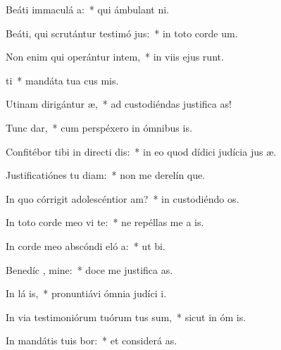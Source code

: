 \item Beáti immaculá  a:~* qui ámbulant   ni.
\item Beáti, qui scrutántur testimó jus:~* in toto corde  um.
\item Non enim qui operántur intem,~* in viis ejus runt.
\item {} ti~* mandáta tua cus mis.
\item Utinam dirigántur  æ,~* ad custodiéndas justifica as!
\item Tunc  dar,~* cum perspéxero in ómnibus  is.
\item Confitébor tibi in directi dis:~* in eo quod dídici judícia jus æ.
\item Justificatiónes tu diam:~* non me derelín que.
\item In quo córrigit adolescéntior  am?~* in custodiéndo  os.
\item In toto corde meo vi te:~* ne repéllas me a  is.
\item In corde meo abscóndi eló a:~* ut   bi.
\item Benedíc , mine:~* doce me justifica as.
\item In lá is,~* pronuntiávi ómnia judíci  i.
\item In via testimoniórum tuórum tus sum,~* sicut in óm is.
\item In mandátis tuis bor:~* et considerá  as.
